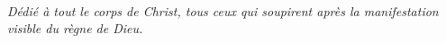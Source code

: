 
\cleardoublepage
~\vfill
\begin{doublespace}
\noindent\fontsize{18}{22}\selectfont\itshape
\nohyphenation
Dédié à tout le corps de Christ, tous ceux qui soupirent
après la manifestation visible du règne de Dieu.

\end{doublespace}
\vfill
\vfill
